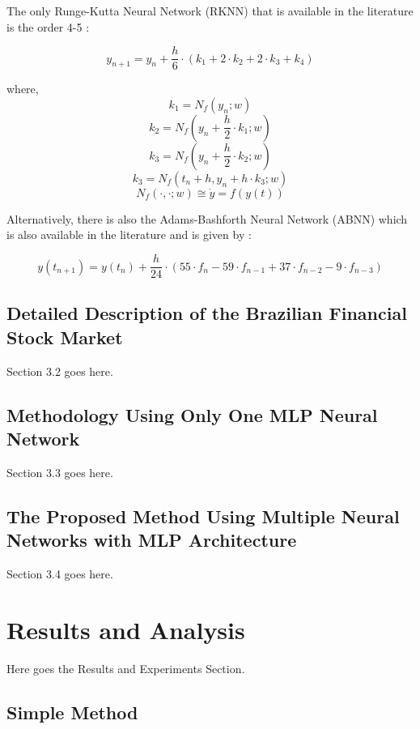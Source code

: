 \documentclass[journal,article,submit,pdftex,moreauthors]{Definitions/mdpi}
\begin{document}
The only Runge-Kutta Neural Network (RKNN) that is available in the literature is the order 4-5 \cite{ref11}:

\begin{equation}
	y_{n+1}= y_n + \frac{h}{6}\cdot(k_1+ 2 \cdot k_2 + 2 \cdot k_3 + k_4)
	\label{eq:6}
\end{equation}

\noindent where,
$$ k_1= N_f(y_n;w) $$
$$ k_2= N_f(y_n + \frac{h}{2}\cdot k_1;w) $$
$$ k_3= N_f(y_n + \frac{h}{2}\cdot k_2;w) $$
$$ k_3= N_f(t_n + h, y_n +{h}\cdot k_3;w) $$
$$ N_f( \cdot, \cdot ;w) \cong \dot{y}=f(y(t))$$

Alternatively, there is also the Adams-Bashforth Neural Network (ABNN) which is also available in the literature and is given by \cite{ref12}:

\begin{equation}
	y(t_{n+1})=y(t_n)+ \frac{h}{24} \cdot (55 \cdot f_{n} - 59 \cdot f_{n-1} + 37 \cdot f_{n -2} - 9 \cdot f_{n-3})
	\label{eq:7}
\end{equation}

\subsection{Detailed Description of the Brazilian Financial Stock Market}

Section 3.2 goes here.


\subsection{Methodology Using Only One MLP Neural Network}

Section 3.3 goes here.



\subsection{The Proposed Method Using Multiple Neural Networks with MLP Architecture}

Section 3.4 goes here.



\section{Results and Analysis}

Here goes the Results and Experiments Section.

\subsection{Simple Method}
\end{document}
